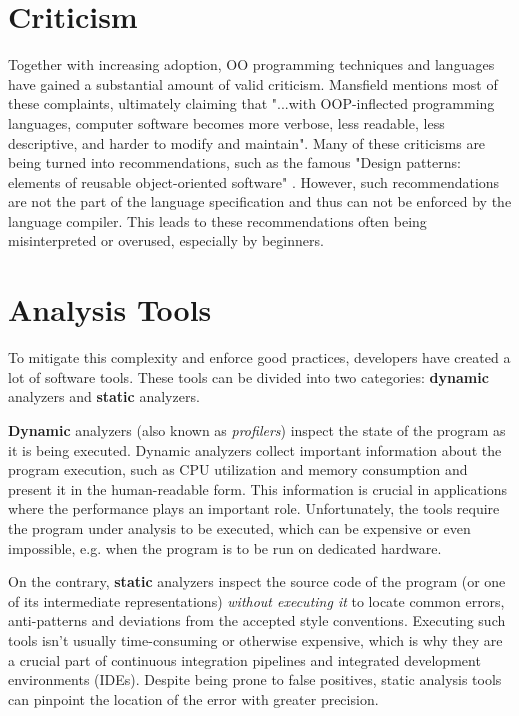 \section{Criticism}

Together with increasing adoption, OO programming techniques and languages have gained a substantial amount of valid criticism. Mansfield \cite{oopfailed} mentions most of these complaints, ultimately claiming that "...with OOP-inflected programming languages, computer software becomes more
verbose, less readable, less descriptive, and harder to modify and maintain". Many of these criticisms are being turned into recommendations, such as the famous "Design patterns: elements of reusable object-oriented software" \cite{GOFPatterns}. However, such recommendations are not the part of the language specification and thus can not be enforced by the language compiler. This leads to these recommendations often being misinterpreted or overused, especially by beginners.

\section{Analysis Tools}
To mitigate this complexity and enforce good practices, developers have created a lot of software tools. These tools can be divided into two categories: \textbf{dynamic} analyzers and \textbf{static} analyzers.

\textbf{Dynamic} analyzers (also known as \textit{profilers}) inspect the state of the program as it is being executed. Dynamic analyzers collect important information about the program execution, such as CPU utilization and memory consumption and present it in the human-readable form. This information is crucial in applications where the performance plays an important role. Unfortunately, the tools require the program under analysis to be executed, which can be expensive or even impossible, e.g. when the program is to be run on dedicated hardware.

On the contrary, \textbf{static} analyzers inspect the source code of the program (or one of its intermediate representations) \textit{without executing it} to locate common errors, anti-patterns and deviations from the accepted style conventions. Executing such tools isn't usually time-consuming or otherwise expensive, which is why they are a crucial part of continuous integration \cite{ci} pipelines and integrated development environments (IDEs).
Despite being prone to false positives, static analysis tools can pinpoint the location of the error with greater precision.


